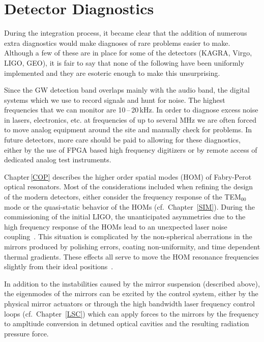 \section{Detector Diagnostics}
\label{s:IDC:diagnostics}
During the integration process, it became clear that the addition of numerous
extra diagnostics would make diagnoses of rare problems easier to make. Although
a few of these are in place for some of the detectors (KAGRA, Virgo, LIGO, GEO),
it is fair to say that none of the following have been uniformly implemented and
they are esoteric enough to make this unsurprising.

Since the GW detection band overlaps mainly with the audio band, the
    digital systems which we use to record signals and hunt for noise. The highest
    frequencies that we can monitor are 10\,--\,20\,kHz. In order to diagnose
    excess noise in lasers, electronics, etc. at frequencies of up to several
    MHz we are often forced to move analog equipment around the site and manually
    check for problems. In future detectors, more care should be paid to allowing
    for these diagnostics, either by the use of FPGA based high frequency
    digitizers or by remote access of dedicated analog test instruments.

Chapter\,\ref{COP} describes the higher order spatial modes (HOM) of
    Fabry-Perot optical resonators. Most of the considerations included when
    refining the design of the modern detectors, either consider the frequency
    response of the TEM$_{00}$ mode or the quasi-static behavior of the
    HOMs (cf.~Chapter~\ref{SIM}). During the commissioning
    of the initial LIGO, the unanticipated asymmetries due to the high frequency
    response of the HOMs lead to an unexpected laser noise coupling~\cite{Stefan:Thesis}.
    This situation is complicated by the non-spherical aberrations in the mirrors
    produced by polishing errors, coating non-uniformity, and time dependent
    thermal gradients. These effects all serve to move the HOM resonance frequencies
    slightly from their ideal positions~\cite{Siegman:Lasers}.

In addition to the instabilities caused by the mirror
    suspension (described above), the eigenmodes of the mirrors can be
    excited by the control system, either by the physical mirror actuators
    or through the high bandwidth laser frequency control loops
    (cf.~Chapter~\ref{LSC}) which can apply forces to the mirrors by the
    frequency to ampltiude conversion in detuned optical cavities and the
    resulting radiation pressure force.

